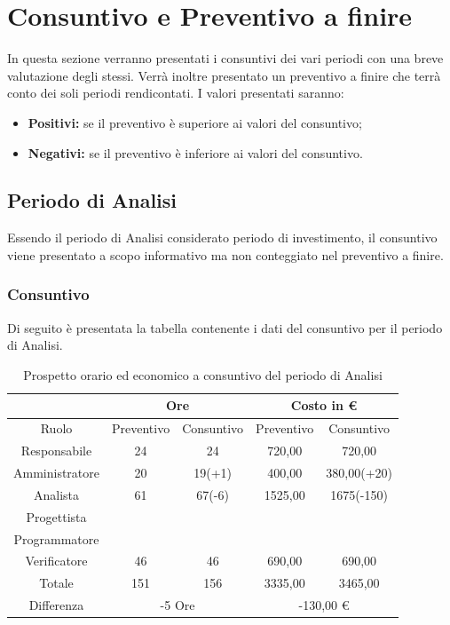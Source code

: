 \documentclass[./PianodiProgetto.tex]{subfiles}
\begin{document}
\chapter{Consuntivo e Preventivo a finire}
In questa sezione verranno presentati i consuntivi dei vari periodi con una
breve valutazione degli stessi. Verrà inoltre presentato un preventivo a finire
che terrà conto dei soli periodi rendicontati. I valori presentati saranno:
\begin{itemize}
\item \textbf{Positivi:} se il preventivo è superiore ai valori del consuntivo;
\item \textbf{Negativi:} se il preventivo è inferiore ai valori del consuntivo.
\end{itemize}
\section{Periodo di Analisi}
Essendo il periodo di Analisi considerato periodo di investimento, il consuntivo viene presentato a scopo informativo ma non conteggiato nel preventivo a finire.
\subsection{Consuntivo}
Di seguito è presentata la tabella contenente i dati del consuntivo per il
periodo di Analisi.

\begin{table}[H]
	\centering
	\begin{tabular}{|c|c|c|c|c|}
		\hline
	 	 & \multicolumn{2}{c|}{Ore} & \multicolumn{2}{c|}{Costo in \euro{}}  \\ \hline
		Ruolo&Preventivo&Consuntivo&Preventivo&Consuntivo \\ \hline
		Responsabile&24&24&720,00&720,00  \\ \hline
		Amministratore&20&19(+1)&400,00&380,00(+20)  \\ \hline
		Analista&61&67(-6)&1525,00&1675(-150)  \\ \hline
		Progettista& & & &  \\ \hline
		Programmatore& & & &  \\ \hline
		Verificatore&46&46&690,00&690,00  \\ \hline
		Totale&151&156&3335,00&3465,00  \\ \hline
		Differenza& \multicolumn{2}{c|}{-5 Ore} & \multicolumn{2}{c|}{-130,00 \euro{}} \\ \hline
	\end{tabular}
	\caption{Prospetto orario ed economico a consuntivo del periodo di Analisi}
\end{table}
\end{document}
